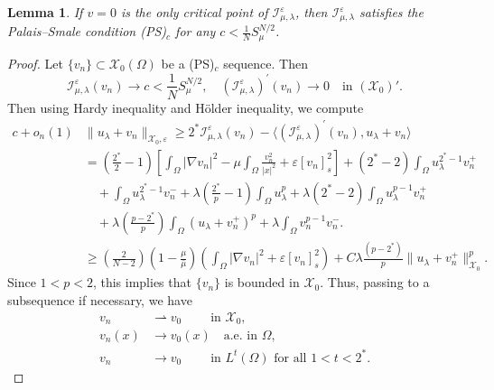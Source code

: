 \documentclass[11pt]{article}
\newtheorem{lemma}{Lemma}[section] %
\newcommand{\om} {\Omega}
\newcommand{\la} {\lambda}
\newcommand{\X}{\mathcal{X}_0} %
\newcommand{\Ie}{\mathcal{I}_{\mu,\lambda}^{\varepsilon}} %
\begin{document}
\begin{lemma}
If \( v = 0 \) is the only critical point of  \( \Ie \), then \( \Ie \) satisfies the Palais–Smale condition (PS)\(_c\) for any \( c < \frac{1}{N} S_{\mu}^{N/2} \).
\end{lemma}
\begin{proof}
Let \( \{v_n\} \subset \X(\om) \) be a (PS)\(_c\) sequence. Then
\begin{equation*}
\Ie(v_n) \to c < \frac{1}{N} S_{\mu}^{N/2}, \quad  (\Ie)^{\prime}(v_n) \to 0 \quad \text{in } (\X)'.
\end{equation*}
Then using Hardy inequality and H\"{o}lder inequality, we compute
\begin{equation*}
\begin{aligned}
c + o_n(1)& \|u_{\lambda} + v_n\|_{\X, \varepsilon}  \geq 2^* \Ie(v_n) - \langle (\Ie)^{\prime}(v_n),u_{\la}+v_n\rangle\\
&= \left( \frac{2^*}{2} - 1 \right) \left[ \int_{\Omega} |\nabla v_n|^2 - \mu \int_{\Omega} \frac{v_n^2}{|x|^2} + \varepsilon [v_n]^2_s \right] + (2^* - 2) \int_{\Omega} u_{\lambda}^{2^* - 1} v_n^+   \\
&\quad +\int_{\Omega} u_{\lambda}^{2^* - 1} v_n^-+ \la\left( \frac{2^*}{ p} - 1 \right) \int_{\om} u_{\la}^{p} + \la(2^*-2) \int_{\Omega} u_{\lambda}^{p-1} v_n^+ \\
& \quad+ \lambda \left( \frac{p - 2^*}{ p} \right) \int_{\Omega} (u_{\lambda} + v_n^+)^{p} + \lambda \int_{\Omega} v_n^{p-1} v_n^-.\\
&\geq \left( \frac{2}{N - 2} \right) \left( 1 - \frac{\mu}{\bar{\mu}} \right) \left( \int_{\Omega} |\nabla v_n|^2 + \varepsilon  [v_n]_s^2 \right) 
+ C \lambda \frac{(p  - 2^*)}{ p} \|u_{\lambda} + v_n^+\|_{\X}^{p }.
\end{aligned}
\end{equation*}
Since \( 1 < p < 2 \), this implies that \( \{v_n\} \) is bounded in \( \X \). Thus, passing to a subsequence if necessary, we have 
\begin{equation}\label{convergence_properties}
\begin{aligned}
v_n &\rightharpoonup v_0 \quad \quad \;\text{in } \X,\\
v_n(x) &\to v_0(x) \quad \text{a.e. in } \Omega,\\
v_n &\to v_0 \quad \quad \;\text{in } L^t(\Omega) \text{ for all } 1 < t < 2^*.
\end{aligned}

\end{equation}
\end{proof}
\end{document}
